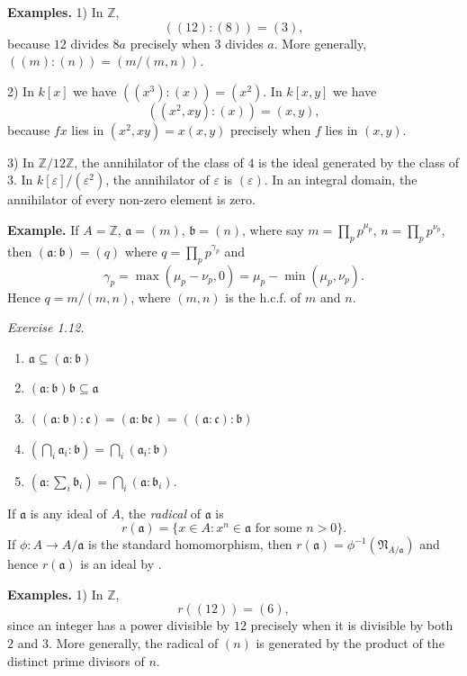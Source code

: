 \textline
\noindent\textbf{Examples.} 1) In $\mathbb Z$,
\[
((12):(8))=(3),
\]
because $12$ divides $8a$ precisely when $3$ divides $a$.  More generally,
$((m):(n))=(m/(m,n))$.

2) In $k[x]$ we have $((x^3):(x))=(x^2)$.  In $k[x,y]$ we have
\[
((x^2,xy):(x))=(x,y),
\]
because $fx$ lies in $(x^2,xy)=x(x,y)$ precisely when $f$ lies in $(x,y)$.

3) In $\mathbb Z/12\mathbb Z$, the annihilator of the class of $4$ is the
ideal generated by the class of $3$.  In
$k[\varepsilon]/(\varepsilon^2)$, the annihilator of $\varepsilon$ is
$(\varepsilon)$.  In an integral domain, the annihilator of every non-zero
element is zero.
\textline

\noindent\textbf{Example.} If $A=\mathbb Z$, $\mathfrak a=(m)$, $\mathfrak b=(n)$, where say $m=\prod_p p^{\mu_p}$, $n=\prod_p p^{\nu_p}$, then $(\mathfrak a:\mathfrak b)=(q)$ where $q=\prod_p p^{\gamma_p}$ and
\[
 \gamma_p=\max(\mu_p-\nu_p,0)=\mu_p-\min(\mu_p,\nu_p).
\]
Hence $q=m/(m,n)$, where $(m,n)$ is the h.c.f. of $m$ and $n$.

\noindent\textit{Exercise 1.12.}
\begin{enumerate}
\renewcommand{\labelenumi}{\roman{enumi})}
\item $\mathfrak a\subseteq(\mathfrak a:\mathfrak b)$
\item $(\mathfrak a:\mathfrak b)\mathfrak b\subseteq\mathfrak a$
\item $((\mathfrak a:\mathfrak b):\mathfrak c)=(\mathfrak a:\mathfrak b\mathfrak c)=((\mathfrak a:\mathfrak c):\mathfrak b)$
\item $(\bigcap_i\mathfrak a_i:\mathfrak b)=\bigcap_i(\mathfrak a_i:\mathfrak b)$
\item $(\mathfrak a:\sum_i\mathfrak b_i)=\bigcap_i(\mathfrak a:\mathfrak b_i)$.
\end{enumerate}

If $\mathfrak a$ is any ideal of $A$, the \textit{radical} of $\mathfrak a$ is
\[
 r(\mathfrak a)=\{x\in A:x^n\in\mathfrak a\text{ for some }n>0\}.
\]
If $\phi:A\longrightarrow A/\mathfrak a$ is the standard homomorphism, then $r(\mathfrak a)=\phi^{-1}(\mathfrak N_{A/\mathfrak a})$ and hence $r(\mathfrak a)$ is an ideal by .

\textline
\noindent\textbf{Examples.} 1) In $\mathbb Z$,
\[
r((12))=(6),
\]
since an integer has a power divisible by $12$ precisely when it is divisible
by both $2$ and $3$.  More generally, the radical of $(n)$ is generated by the
product of the distinct prime divisors of $n$.

